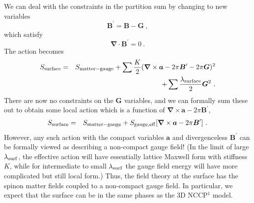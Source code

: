\documentclass[prb,twocolumn]{revtex4-1}
\begin{document}
 We can deal with the constraints in the partition sum by changing to new variables
\begin{equation}
{\bm B}^\prime = {\bm B} - {\bm G} ~,
\end{equation}
which satisfy
\begin{equation}
{\bm \nabla} \cdot {\bm B}^\prime = 0 ~.
\end{equation}
The action becomes 
\begin{eqnarray*}
S_{\rm surface} &=& S_{\rm matter-gauge} + \sum \frac{K}{2} ({\bm\nabla} \times {\bm a}  - 2\pi {\bm B}^\prime - 2\pi {\bm G})^2 \\
&& + \sum \frac{\lambda_{\rm surface}}{2} {\bm G}^2 ~.
\end{eqnarray*}
There are now no constraints on the ${\bm G}$ variables, and we can formally sum these out to obtain some local action which is a function of ${\bm\nabla} \times {\bm a} - 2\pi {\bm B}^\prime$,
\begin{eqnarray*}
S_{\rm surface} &=& S_{\rm matter-gauge} + S_{\rm gauge, eff}[{\bm\nabla} \times {\bm a}  - 2\pi {\bm B}^\prime] ~.
\end{eqnarray*}
However, any such action with the compact variables ${\bm a}$ and divergenceless ${\bm B}^\prime$ can be formally viewed as describing a non-compact gauge field!  (In the limit of large $\lambda_{\rm surf}$, the effective action will have essentially lattice Maxwell form with stiffness $K$, while for intermediate to small $\lambda_{\rm surf}$ the gauge field energy will have more complicated but still local form.)  Thus, the field theory at the surface has the spinon matter fields coupled to a non-compact gauge field.  In particular, we expect that the surface can be in the same phases as the 3D NCCP$^1$ model.

\end{document}
